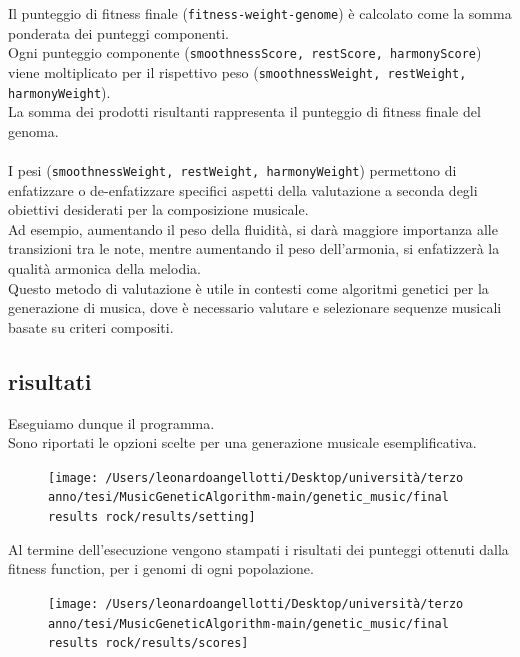 \documentclass[a4paper,12pt]{report}
\begin{document}
Il punteggio di fitness finale (\texttt{fitness-weight-genome}) è calcolato come la somma ponderata dei punteggi componenti. \\
Ogni punteggio componente (\texttt{smoothnessScore, restScore, harmonyScore}) viene moltiplicato per il rispettivo peso (\texttt{smoothnessWeight, restWeight, harmonyWeight}). \\
La somma dei prodotti risultanti rappresenta il punteggio di fitness finale del genoma. \\
\\
I pesi (\texttt{smoothnessWeight, restWeight, harmonyWeight}) permettono di enfatizzare o de-enfatizzare specifici aspetti della valutazione a seconda degli obiettivi desiderati per la composizione musicale. \\
Ad esempio, aumentando il peso della fluidità, si darà maggiore importanza alle transizioni tra le note, mentre aumentando il peso dell'armonia, si enfatizzerà la qualità armonica della melodia. \\
Questo metodo di valutazione è utile in contesti come algoritmi genetici per la generazione di musica, dove è necessario valutare e selezionare sequenze musicali basate su criteri compositi.

\subsection{risultati}

Eseguiamo dunque il programma. \\
Sono riportati le opzioni scelte per una generazione musicale esemplificativa.

\begin{figure}[H]
    \centering
    \texttt{[image: /Users/leonardoangellotti/Desktop/università/terzo anno/tesi/MusicGeneticAlgorithm-main/genetic\_music/final results rock/results/setting]} 
    \label{fig:immagine}
\end{figure}

Al termine dell'esecuzione vengono stampati i risultati dei punteggi ottenuti dalla fitness function, per i genomi di ogni popolazione.

\begin{figure}[H]
    \centering
    \texttt{[image: /Users/leonardoangellotti/Desktop/università/terzo anno/tesi/MusicGeneticAlgorithm-main/genetic\_music/final results rock/results/scores]} 
    \label{fig:immagine}
\end{figure}
\end{document}

